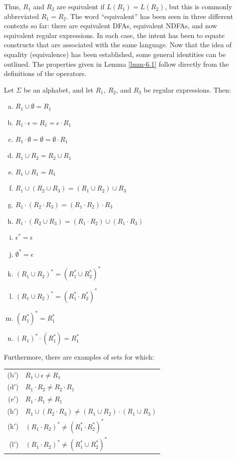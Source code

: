 Thus, $R_1$ and $R_2$ are equivalent if $L(R_1) = L(R_2)$, but this is commonly
abbreviated $R_1 = R_2$. The word ``equivalent'' has been seen in three
different contexts so far: there are equivalent DFAs, equivalent NDFAs, and now
equivalent regular expressions. In each case, the intent has been to equate
constructs that are associated with the same language. Now that the idea of
equality (equivalence) has been established, some general identities can be
outlined. The properties given in Lemma \ref{lmm-6.1} follow directly from the definitions
of the operators.

\begin{lmm}\label{lmm-6.1}
Let $\Sigma$ be an alphabet, and let $R_1,\ R_2$, and $R_3$ be regular
expressions. Then:
\begin{enumerate}[(a)]
\item $R_1 \cup \emptyset = R_1$
\item $R_1 \cdot \epsilon = R_1 = \epsilon \cdot R_1$
\item $R_1 \cdot \emptyset = \emptyset = \emptyset \cdot R_1$
\item $R_1 \cup R_2 = R_2 \cup R_1$
\item $R_1 \cup R_1 = R_1$
\item $R_1 \cup (R_2 \cup R_3) = (R_1 \cup R_2) \cup R_3$
\item $R_1 \cdot (R_2 \cdot R_3) = (R_1 \cdot R_2) \cdot R_3$
\item $R_1 \cdot (R_2 \cup R_3) = (R_1 \cdot R_2) \cup (R_1 \cdot R_3)$
\item $\epsilon^* = \epsilon$
\item $\emptyset^* = \epsilon$
\item $(R_1 \cup R_2)^* = (R^*_1 \cup R^*_2)^*$
\item $(R_1 \cup R_2)^* = (R^*_1 \cdot R^*_2)^*$
\item $(R^*_1)^* = R^*_1$
\item $(R_1)^* \cdot (R^*_1) = R^*_1$
\end{enumerate}
Furthermore, there are examples of sets for which: \\
\begin{tabular}{rl}
(b$'$) & $R_1 \cup \epsilon \not= R_1$ \\
(d$'$) & $R_1 \cdot R_2 \not= R_2 \cdot R_1$ \\
(e$'$) & $R_1 \cdot R_1 \not= R_1$ \\
(h$'$) & $R_1 \cup (R_2 \cdot R_3) \not= (R_1 \cup R_2) \cdot (R_1 \cup R_3)$ \\
(k$'$) & $(R_1 \cdot R_2)^* \not= (R^*_1 \cdot R^*_2)^*$ \\
(l$'$) & $(R_1 \cdot R_2)^* \not= (R^*_1 \cup R^*_2)^*$
\end{tabular}


\end{lmm}
